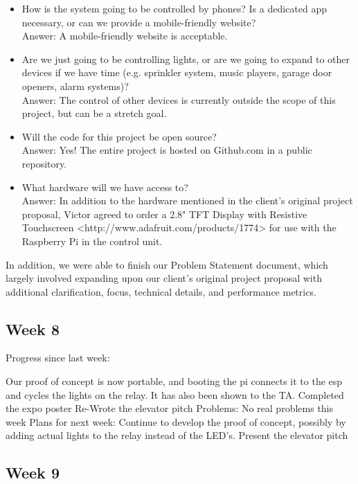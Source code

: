 \documentclass[letterpaper,10pt]{article}
\begin{document}
\begin{itemize}
    \item How is the system going to be controlled by phones?  Is a dedicated
        app necessary, or can we provide a mobile-friendly website?\\ Answer: A
        mobile-friendly website is acceptable.
    \item Are we just going to be controlling lights, or are we going to expand
        to other devices if we have time (e.g. sprinkler system, music players,
        garage door openers, alarm systems)?\\
        Answer: The control of other devices is currently outside the scope of
        this project, but can be a stretch goal.
    \item Will the code for this project be open source?\\
        Answer: Yes!  The entire project is hosted on Github.com in a public
        repository.
    \item What hardware will we have access to?\\
        Answer: In addition to the hardware mentioned in the client's original
        project proposal, Victor agreed to order a 2.8" TFT Display with
        Resistive Touchscreen <http://www.adafruit.com/products/1774> for use
        with the Raspberry Pi in the control unit.
\end{itemize}

In addition, we were able to finish our Problem Statement document, which
largely involved expanding upon our client's original project proposal with
additional clarification, focus, technical details, and performance metrics.

\subsection{Week 8}
 
Progress since last week: 
 
Our proof of concept is now portable, and booting the pi connects it to the esp and cycles the lights on the relay. It has also been shown to the TA. 
Completed the expo poster 
Re-Wrote the elevator pitch 
Problems: 
No real problems this week 
Plans for next week: 
Continue to develop the proof of concept, possibly by adding actual lights to the relay instead of the LED's. 
Present the elevator pitch 

\subsection{Week 9}
 
\end{document}
